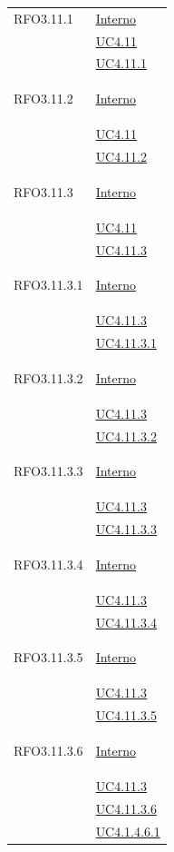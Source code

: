 \begin{itemize}
\begin{itemize}
\begin{itemize}
\begin{itemize}
\begin{longtable}{|>{\centering}m{5cm}|m{5cm}<{\centering}|}
\hypertarget{RFO3.11.1}{RFO3.11.1} & \hyperlink{Interno}{Interno}\\
& \hyperref[UC4.11]{UC4.11}\\
& \hyperref[UC4.11.1]{UC4.11.1}\\ \hline

\hypertarget{RFO3.11.2}{RFO3.11.2} & \hyperlink{Interno}{Interno}\\
& \hyperref[UC4.11]{UC4.11}\\
& \hyperref[UC4.11.2]{UC4.11.2}\\ \hline

\hypertarget{RFO3.11.3}{RFO3.11.3} & \hyperlink{Interno}{Interno}\\
& \hyperref[UC4.11]{UC4.11}\\
& \hyperref[UC4.11.3]{UC4.11.3}\\ \hline

\hypertarget{RFO3.11.3.1}{RFO3.11.3.1} & \hyperlink{Interno}{Interno}\\
& \hyperref[UC4.11.3]{UC4.11.3}\\
& \hyperref[UC4.11.3.1]{UC4.11.3.1}\\ \hline

\hypertarget{RFO3.11.3.2}{RFO3.11.3.2} & \hyperlink{Interno}{Interno}\\
& \hyperref[UC4.11.3]{UC4.11.3}\\
& \hyperref[UC4.11.3.2]{UC4.11.3.2}\\ \hline

\hypertarget{RFO3.11.3.3}{RFO3.11.3.3} & \hyperlink{Interno}{Interno}\\
& \hyperref[UC4.11.3]{UC4.11.3}\\
& \hyperref[UC4.11.3.3]{UC4.11.3.3}\\ \hline

\hypertarget{RFO3.11.3.4}{RFO3.11.3.4} & \hyperlink{Interno}{Interno}\\
& \hyperref[UC4.11.3]{UC4.11.3}\\
& \hyperref[UC4.11.3.4]{UC4.11.3.4}\\ \hline

\hypertarget{RFO3.11.3.5}{RFO3.11.3.5} & \hyperlink{Interno}{Interno}\\
& \hyperref[UC4.11.3]{UC4.11.3}\\
& \hyperref[UC4.11.3.5]{UC4.11.3.5}\\ \hline

\hypertarget{RFO3.11.3.6}{RFO3.11.3.6} & \hyperlink{Interno}{Interno}\\
& \hyperref[UC4.11.3]{UC4.11.3}\\
& \hyperref[UC4.11.3.6]{UC4.11.3.6}\\
& \hyperref[UC4.1.4.6.1]{UC4.1.4.6.1}\\ \hline


\end{longtable}
\end{itemize}
\end{itemize}
\end{itemize}
\end{itemize}
